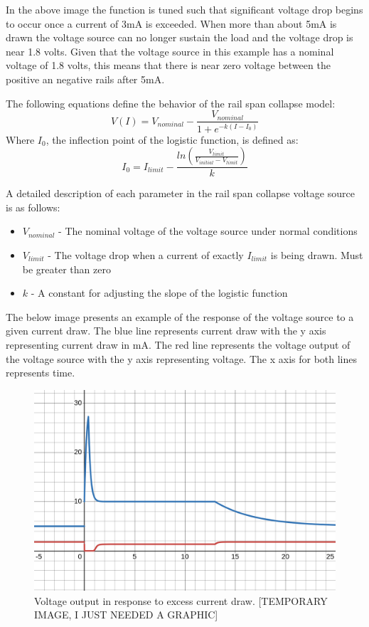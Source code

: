 \documentclass[conference]{IEEEtran}
\begin{document}
In the above image the function is tuned such that significant voltage drop begins to occur once a current of 3mA is exceeded. When more than about 5mA is drawn the voltage source can no longer sustain the load and the voltage drop is near 1.8 volts. Given that the voltage source in this example has a nominal voltage of 1.8 volts, this means that there is near zero voltage between the positive an negative rails after 5mA.

The following equations define the behavior of the rail span collapse model:
{\Large
\[V(I)=V_{nominal}-\frac{V_{nominal}}{1+e^{-k(I-I_0)}}\]
}
Where \(I_0\), the inflection point of the logistic function, is defined as:
{\Large
\[I_0=I_{limit}-\frac{ln(\frac{V_{limit}}{V_{initial}-V_{limit}})}{k}\]
}

A detailed description of each parameter in the rail span collapse voltage source is as follows:

\begin{itemize}

\item[] \(V_{nominal}\) - The nominal voltage of the voltage source under normal conditions

\item[] \(V_{limit}\) - The voltage drop when a current of exactly \(I_{limit}\) is being drawn. Must be greater than zero

\item[] \(k\) - A constant for adjusting the slope of the logistic function

\end{itemize}

The below image presents an example of the response of the voltage source to a given current draw. The blue line represents current draw with the y axis representing current draw in mA. The red line represents the voltage output of the voltage source with the y axis representing voltage. The x axis for both lines represents time.

\begin{figure}[htbp]
\centering
\includegraphics[width=0.9\linewidth]{Voltage_Collapse_Response.png}
\caption{Voltage output in response to excess current draw. [TEMPORARY IMAGE, I JUST NEEDED A GRAPHIC]}
\label{fig:rail_collapse_response}
\end{figure}
\end{document}
